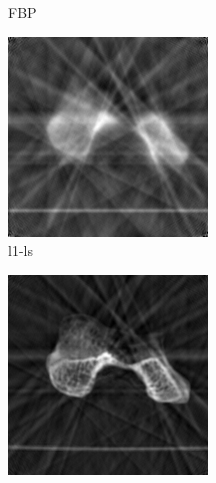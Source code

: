 \documentclass[journal]{IEEEtran}
\begin{document}
\begin{figure}[!h]
\begin{subfigure}[b]{0.23\linewidth}
        \caption{FBP}
     \end{subfigure}
    \begin{subfigure}[b]{0.23\linewidth}
        \includegraphics[width=\textwidth]{../images/humerus/global_local/reconNoPrior.png}
        \caption{l1-ls}
        \label{fig:humerus_cs}
    \end{subfigure}
    \begin{subfigure}[b]{0.23\linewidth}
        \includegraphics[width=\textwidth]{../images/humerus/global_local/global.png}

\end{subfigure}
\end{figure}
\end{document}
